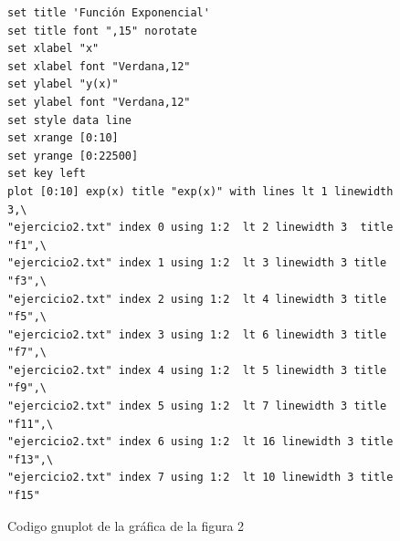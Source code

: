 \documentclass[12pt,a4paper,twoside]{article}
\begin{document}
\begin{figure}[h]
\begin{verbatim}
set title 'Función Exponencial'
set title font ",15" norotate
set xlabel "x"
set xlabel font "Verdana,12"
set ylabel "y(x)"
set ylabel font "Verdana,12"
set style data line
set xrange [0:10]
set yrange [0:22500]
set key left
plot [0:10] exp(x) title "exp(x)" with lines lt 1 linewidth 3,\
"ejercicio2.txt" index 0 using 1:2  lt 2 linewidth 3  title "f1",\
"ejercicio2.txt" index 1 using 1:2  lt 3 linewidth 3 title "f3",\
"ejercicio2.txt" index 2 using 1:2  lt 4 linewidth 3 title "f5",\
"ejercicio2.txt" index 3 using 1:2  lt 6 linewidth 3 title "f7",\
"ejercicio2.txt" index 4 using 1:2  lt 5 linewidth 3 title "f9",\
"ejercicio2.txt" index 5 using 1:2  lt 7 linewidth 3 title "f11",\
"ejercicio2.txt" index 6 using 1:2  lt 16 linewidth 3 title "f13",\
"ejercicio2.txt" index 7 using 1:2  lt 10 linewidth 3 title "f15"
\end{verbatim}
\caption{Codigo gnuplot de la gráfica de la figura 2}
\label{fig:figura3}
\end{figure}
\end{document}
